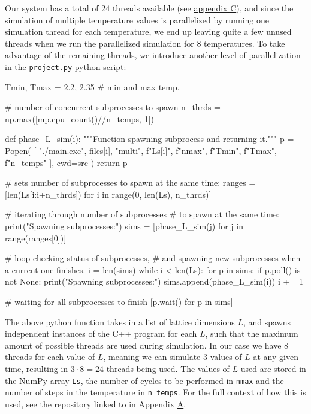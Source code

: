 \documentclass[reprint,english,notitlepage]{revtex4-1}  %
\begin{document}
Our system has a total of \(24\) threads available (see \hyperref[C]{appendix C}), and since the simulation of multiple temperature values is parallelized by running one simulation thread for each temperature, we end up leaving quite a few unused threads when we run the parallelized simulation for \(8\) temperatures. To take advantage of the remaining threads, we introduce another level of parallelization in the \verb+project.py+ python-script:
\begin{python}
Tmin, Tmax = 2.2, 2.35  # min and max temp.

# number of concurrent subprocesses to spawn
n_thrds = np.max([mp.cpu_count()//n_temps, 1])

def phase_L_sim(i):
    """Function spawning subprocess and returning it."""
    p = Popen(
        [
            "./main.exe",
            files[i],
            "multi",
            f"{Ls[i]}",
            f"{nmax}",
            f"{Tmin}",
            f"{Tmax}",
            f"{n_temps}"
        ],
        cwd=src
    )
    return p

# sets number of subprocesses to spawn at the same time:
ranges = [len(Ls[i:i+n_thrds])
		  for i in range(0, len(Ls), n_thrds)]
		  
# iterating through number of subprocesses
# to spawn at the same time:
print("Spawning subprocesses:")
sims = [phase_L_sim(j) for j in range(ranges[0])]

# loop checking status of subprocesses,
# and spawning new subprocesses when a current one finishes.
i = len(sims)
while i < len(Ls):
    for p in sims:
        if p.poll() is not None:
            print("Spawning subprocesses:")
            sims.append(phase_L_sim(i))
            i += 1

# waiting for all subprocesses to finish
[p.wait() for p in sims]
\end{python}
The above python function takes in a list of lattice dimensions \(L\), and spawns independent instances of the C++ program for each \(L\), such that the maximum amount of possible threads are used during simulation. In our case we have \(8\) threads for each value of \(L\), meaning we can simulate \(3\) values of \(L\) at any given time, resulting in \(3\cdot 8 = 24\) threads being used. The values of $L$ used are stored in the NumPy \citep{numpy} array \verb+Ls+, the number of cycles to be performed in \verb+nmax+ and the number of steps in the temperature in \verb+n_temps+. For the full context of how this is used, see the repository linked to in Appendix \hyperref[A]{A}.
\end{document}
